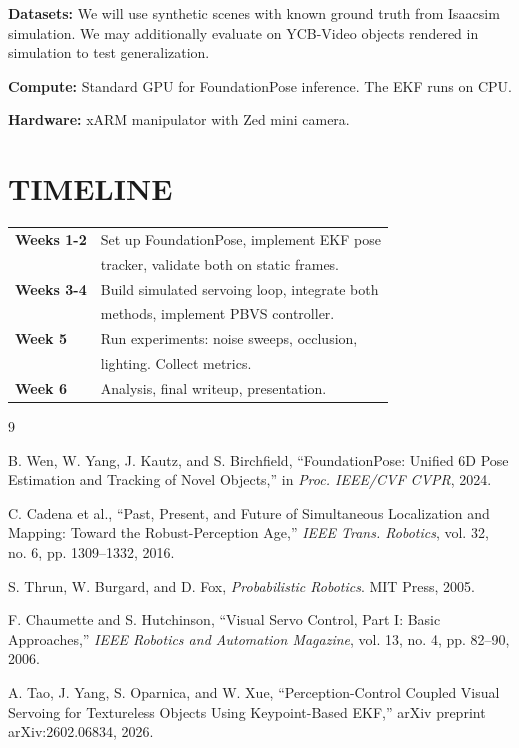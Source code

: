\documentclass[letterpaper, 10 pt, conference]{ieeeconf}  %
\begin{document}
\textbf{Datasets:} We will use synthetic scenes with known ground truth from Isaacsim simulation. We may additionally evaluate on YCB-Video objects rendered in simulation to test generalization.

\textbf{Compute:} Standard GPU for FoundationPose inference. The EKF runs on CPU. 

\textbf{Hardware:} xARM manipulator with Zed mini camera.

\section{TIMELINE}

\begin{tabular}{l l}
\textbf{Weeks 1-2} & Set up FoundationPose, implement EKF pose \\
 & tracker, validate both on static frames. \\
\textbf{Weeks 3-4} & Build simulated servoing loop, integrate both \\
 & methods, implement PBVS controller. \\
\textbf{Week 5} & Run experiments: noise sweeps, occlusion, \\
 & lighting. Collect metrics. \\
\textbf{Week 6} & Analysis, final writeup, presentation. \\
\end{tabular}

\begin{thebibliography}{9}

 B. Wen, W. Yang, J. Kautz, and S. Birchfield, ``FoundationPose: Unified 6D Pose Estimation and Tracking of Novel Objects,'' in \textit{Proc. IEEE/CVF CVPR}, 2024.

 C. Cadena et al., ``Past, Present, and Future of Simultaneous Localization and Mapping: Toward the Robust-Perception Age,'' \textit{IEEE Trans. Robotics}, vol. 32, no. 6, pp. 1309--1332, 2016.

 S. Thrun, W. Burgard, and D. Fox, \textit{Probabilistic Robotics}. MIT Press, 2005.

 F. Chaumette and S. Hutchinson, ``Visual Servo Control, Part I: Basic Approaches,'' \textit{IEEE Robotics and Automation Magazine}, vol. 13, no. 4, pp. 82--90, 2006.

A. Tao, J. Yang, S. Oparnica, and W. Xue, ``Perception-Control Coupled Visual Servoing for Textureless Objects Using Keypoint-Based EKF,'' arXiv preprint arXiv:2602.06834, 2026.


\end{thebibliography}
\end{document}
